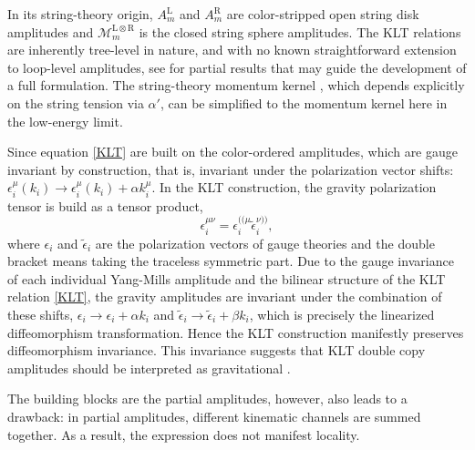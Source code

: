 \documentclass[a4paper,11pt]{article}
\begin{document}
In its string-theory origin, $A_m^{\mathrm L}$ and $A_m^{\mathrm R}$ are color-stripped open string disk amplitudes and $\mathcal{M}_m^{\mathrm{L\otimes R}}$ is the closed string sphere amplitudes. 
The KLT relations are inherently tree-level in nature, and with no known straightforward extension to loop-level amplitudes, see \cite{He:2016mzd} for partial results that may guide the development of a full formulation.
The string-theory momentum kernel \cite{Bjerrum-Bohr:2010pnr}, which depends explicitly on the string tension via $\alpha'$, can be simplified to the momentum kernel here in the low-energy limit.\par
Since equation \eqref{KLT} are built on the color-ordered amplitudes, which are gauge invariant by construction, that is, invariant under the polarization vector shifts: $\epsilon_i^\mu(k_i)\to \epsilon_i^{\mu}(k_i)+\alpha k_i^\mu$.
In the KLT construction, the gravity polarization tensor is build as a tensor product,
\begin{equation*}
    \epsilon^{\mu \nu}_i=\epsilon^{((\mu}_i \tilde{\epsilon}_i^{\nu))},
\end{equation*}
where $\epsilon_i$ and $\tilde{\epsilon}_i$ are the polarization vectors of gauge theories and the double bracket means taking the traceless symmetric part. 
Due to the gauge invariance of each individual Yang-Mills amplitude and the bilinear structure of the KLT relation \eqref{KLT}, the gravity amplitudes are invariant under the combination of these shifts, 
$\epsilon_i\to \epsilon_i+\alpha k_i$ and $\tilde\epsilon_i\to \tilde\epsilon_i+\beta k_i$, 
which is precisely the linearized diffeomorphism transformation. Hence the KLT construction manifestly preserves diffeomorphism invariance.
This invariance suggests that KLT double copy amplitudes should be interpreted as gravitational \cite{Bern:2008qj,Bern:2010ue,Bern:2010yg,Chiodaroli:2017ngp}.\par
The building blocks are the partial amplitudes, however, also leads to a drawback: in partial amplitudes, different kinematic channels are summed together. 
As a result, the expression does not manifest locality.\par
\end{document}
